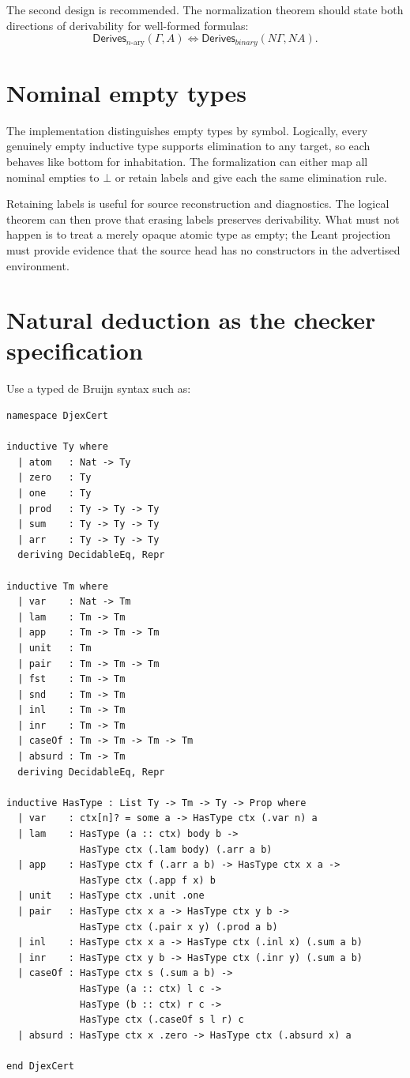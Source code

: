 \documentclass[11pt,letterpaper,openany]{report}
\theoremstyle{definition}
\theoremstyle{remark}
\begin{document}
The second design is recommended. The normalization theorem should state both directions of derivability for well-formed formulas:
\[
  \mathsf{Derives}_{n\text{-ary}}(\Gamma,A)
  \iff
  \mathsf{Derives}_{binary}(N\Gamma,NA).
\]

\section{Nominal empty types}

The implementation distinguishes empty types by symbol. Logically, every genuinely empty inductive type supports elimination to any target, so each behaves like bottom for inhabitation. The formalization can either map all nominal empties to \(\bot\) or retain labels and give each the same elimination rule.

Retaining labels is useful for source reconstruction and diagnostics. The logical theorem can then prove that erasing labels preserves derivability. What must not happen is to treat a merely opaque atomic type as empty; the Leant projection must provide evidence that the source head has no constructors in the advertised environment.

\section{Natural deduction as the checker specification}

Use a typed de Bruijn syntax such as:

\begin{lstlisting}[language=LeanFour,caption={Illustrative core syntax; exact names may change.}]
namespace DjexCert

inductive Ty where
  | atom   : Nat -> Ty
  | zero   : Ty
  | one    : Ty
  | prod   : Ty -> Ty -> Ty
  | sum    : Ty -> Ty -> Ty
  | arr    : Ty -> Ty -> Ty
  deriving DecidableEq, Repr

inductive Tm where
  | var    : Nat -> Tm
  | lam    : Tm -> Tm
  | app    : Tm -> Tm -> Tm
  | unit   : Tm
  | pair   : Tm -> Tm -> Tm
  | fst    : Tm -> Tm
  | snd    : Tm -> Tm
  | inl    : Tm -> Tm
  | inr    : Tm -> Tm
  | caseOf : Tm -> Tm -> Tm -> Tm
  | absurd : Tm -> Tm
  deriving DecidableEq, Repr

inductive HasType : List Ty -> Tm -> Ty -> Prop where
  | var    : ctx[n]? = some a -> HasType ctx (.var n) a
  | lam    : HasType (a :: ctx) body b ->
             HasType ctx (.lam body) (.arr a b)
  | app    : HasType ctx f (.arr a b) -> HasType ctx x a ->
             HasType ctx (.app f x) b
  | unit   : HasType ctx .unit .one
  | pair   : HasType ctx x a -> HasType ctx y b ->
             HasType ctx (.pair x y) (.prod a b)
  | inl    : HasType ctx x a -> HasType ctx (.inl x) (.sum a b)
  | inr    : HasType ctx y b -> HasType ctx (.inr y) (.sum a b)
  | caseOf : HasType ctx s (.sum a b) ->
             HasType (a :: ctx) l c ->
             HasType (b :: ctx) r c ->
             HasType ctx (.caseOf s l r) c
  | absurd : HasType ctx x .zero -> HasType ctx (.absurd x) a

end DjexCert
\end{lstlisting}
\end{document}
